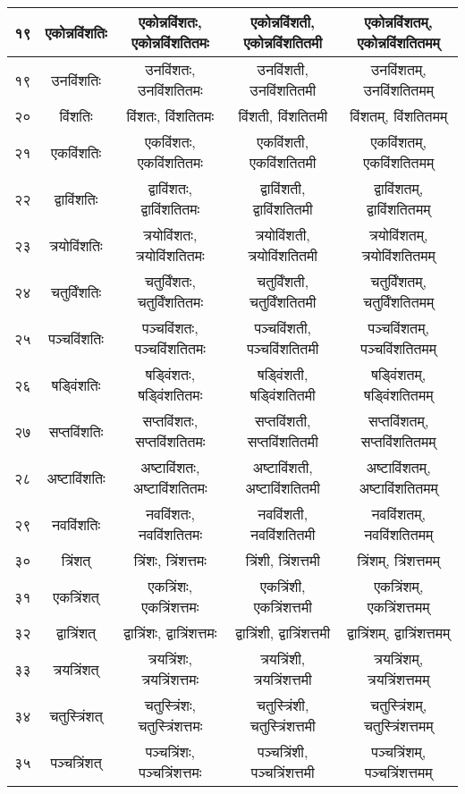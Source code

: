 \documentclass[leqno,fleqn,12pt]{article}%
\begin{document}
\begin{center}
\begin{supertabular}{|lc|c|c|c|}
१९ & एकोन्नविंशतिः & एकोन्नविंशतः, एकोन्नविंशतितमः & एकोन्नविंशती, एकोन्नविंशतितमी & एकोन्नविंशतम्, एकोन्नविंशतितमम् \\ \hline 
१९ & उनविंशतिः & उनविंशतः, उनविंशतितमः & उनविंशती, उनविंशतितमी & उनविंशतम्, उनविंशतितमम् \\ \hline 
२० & विंशतिः & विंशतः, विंशतितमः & विंशती, विंशतितमी & विंशतम्, विंशतितमम् \\ \hline 
२१ & एकविंशतिः & एकविंशतः, एकविंशतितमः & एकविंशती, एकविंशतितमी & एकविंशतम्, एकविंशतितमम् \\ \hline 
२२ & द्वाविंशतिः & द्वाविंशतः, द्वाविंशतितमः & द्वाविंशती, द्वाविंशतितमी & द्वाविंशतम्, द्वाविंशतितमम् \\ \hline 
२३ & त्रयोविंशतिः & त्रयोविंशतः, त्रयोविंशतितमः & त्रयोविंशती, त्रयोविंशतितमी & त्रयोविंशतम्, त्रयोविंशतितमम् \\ \hline 
२४ & चतुर्विंशतिः & चतुर्विंशतः, चतुर्विंशतितमः & चतुर्विंशती, चतुर्विंशतितमी & चतुर्विंशतम्, चतुर्विंशतितमम् \\ \hline 
२५ & पञ्चविंशतिः & पञ्चविंशतः, पञ्चविंशतितमः & पञ्चविंशती, पञ्चविंशतितमी & पञ्चविंशतम्, पञ्चविंशतितमम् \\ \hline 
२६ & षड्विंशतिः & षड्विंशतः, षड्विंशतितमः & षड्विंशती, षड्विंशतितमी & षड्विंशतम्, षड्विंशतितमम् \\ \hline 
२७ & सप्तविंशतिः & सप्तविंशतः, सप्तविंशतितमः & सप्तविंशती, सप्तविंशतितमी & सप्तविंशतम्, सप्तविंशतितमम् \\ \hline 
२८ & अष्टाविंशतिः & अष्टाविंशतः, अष्टाविंशतितमः & अष्टाविंशती, अष्टाविंशतितमी & अष्टाविंशतम्, अष्टाविंशतितमम् \\ \hline 
२९ & नवविंशतिः & नवविंशतः, नवविंशतितमः & नवविंशती, नवविंशतितमी & नवविंशतम्, नवविंशतितमम् \\ \hline 
३० & त्रिंशत् & त्रिंशः, त्रिंशत्तमः & त्रिंशी, त्रिंशत्तमी & त्रिंशम्, त्रिंशत्तमम् \\ \hline 
३१ & एकत्रिंशत् & एकत्रिंशः, एकत्रिंशत्तमः & एकत्रिंशी, एकत्रिंशत्तमी & एकत्रिंशम्, एकत्रिंशत्तमम् \\ \hline 
३२ & द्वात्रिंशत् & द्वात्रिंशः, द्वात्रिंशत्तमः & द्वात्रिंशी, द्वात्रिंशत्तमी & द्वात्रिंशम्, द्वात्रिंशत्तमम् \\ \hline 
३३ & त्रयत्रिंशत् & त्रयत्रिंशः, त्रयत्रिंशत्तमः & त्रयत्रिंशी, त्रयत्रिंशत्तमी & त्रयत्रिंशम्, त्रयत्रिंशत्तमम् \\ \hline 
३४ & चतुस्त्रिंशत् & चतुस्त्रिंशः, चतुस्त्रिंशत्तमः & चतुस्त्रिंशी, चतुस्त्रिंशत्तमी & चतुस्त्रिंशम्, चतुस्त्रिंशत्तमम् \\ \hline 
३५ & पञ्चत्रिंशत् & पञ्चत्रिंशः, पञ्चत्रिंशत्तमः & पञ्चत्रिंशी, पञ्चत्रिंशत्तमी & पञ्चत्रिंशम्, पञ्चत्रिंशत्तमम् \\ \hline 

\end{supertabular}
\end{center}
\end{document}
